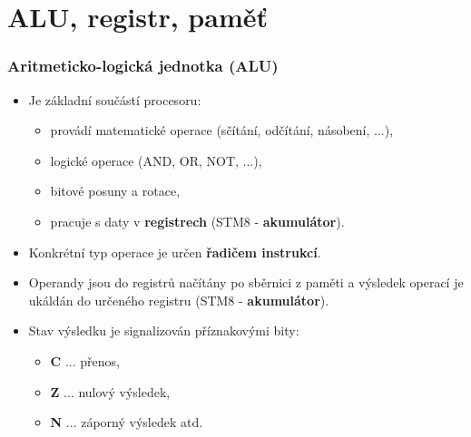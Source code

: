 \section{\texorpdfstring{ALU, registr, paměť}{ALU, registr, pamet}}

	\begin{frame}
    \frametitle{Aritmeticko-logická jednotka (ALU)}
		\small
		
		\begin{itemize}
			\item Je základní součástí procesoru:
			\begin{itemize}
				\item provádí matematické operace (sčítání, odčítání, násobení, ...),
				\item logické operace (AND, OR, NOT, ...),
				\item bitové posuny a rotace,
				\item pracuje s daty v \textbf{registrech} (STM8 - \textbf{akumulátor}).
			\end{itemize}
				
			\vspace{3mm}
			\item Konkrétní typ operace je určen \textbf{řadičem instrukcí}.
			\item Operandy jsou do registrů načítány po sběrnici z paměti a výsledek operací je ukáldán do určeného registru (STM8 - \textbf{akumulátor}).
			\item Stav výsledku je signalizován příznakovými bity:
			
			\begin{itemize}
				\item \textbf{C} ... přenos,
				\item \textbf{Z} ... nulový výsledek,
				\item \textbf{N} ... záporný výsledek atd.
			\end{itemize}
		\end{itemize}
		
	\end{frame}
	
